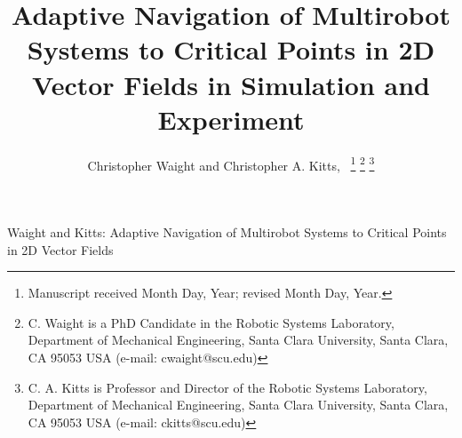 \documentclass[lettersize,journal]{IEEEtran}
\providecommand{\DIFdelbegin}{\protect\color{DIFdeltx}} %
\providecommand{\DIFdelend}{\protect\color{black}} %
\providecommand{\DIFscaledelfig}{0.5} %
\newlength{\DIFdelgraphicswidth} %
\newlength{\DIFdelgraphicsheight} %
\providecommand{\DIFdelincludegraphics}[2][]{%
\sbox{\DIFdelgraphicsbox}{\DIFOincludegraphics[#1]{#2}}%
\settoboxwidth{\DIFdelgraphicswidth}{\DIFdelgraphicsbox} %
\settoboxtotalheight{\DIFdelgraphicsheight}{\DIFdelgraphicsbox} %
\scalebox{\DIFscaledelfig}{%
\parbox[b]{\DIFdelgraphicswidth}{\usebox{\DIFdelgraphicsbox}\\[-\baselineskip] \rule{\DIFdelgraphicswidth}{0em}}\llap{\resizebox{\DIFdelgraphicswidth}{\DIFdelgraphicsheight}{%
\setlength{\unitlength}{\DIFdelgraphicswidth}%
\begin{picture}(1,1)%
\thicklines\linethickness{2pt} %
{\color{DIFdeltx}\put(0,0){\framebox(1,1){}}}%
{\color{DIFdeltx}\put(0,0){\line( 1,1){1}}}%
{\color{DIFdeltx}\put(0,1){\line(1,-1){1}}}%
\end{picture}%
}\hspace*{3pt}}} %
} %
\DeclareRobustCommand{\DIFdelbegin}{\DIFOdelbegin \let\includegraphics\DIFdelincludegraphics} %
\DeclareRobustCommand{\DIFdelend}{\DIFOdelend \let\includegraphics\DIFOincludegraphics} %
\begin{document}
\title{Adaptive Navigation of Multirobot Systems to Critical Points in 2D Vector Fields in Simulation and Experiment}
\author{Christopher Waight and Christopher A. Kitts,~
\thanks{Manuscript received Month Day, Year; revised Month Day, Year.}
\thanks{C. Waight is a PhD Candidate in the Robotic Systems Laboratory, Department of Mechanical Engineering, Santa Clara University, Santa Clara, CA 95053 USA (e-mail: cwaight@scu.edu)}
\thanks{C. A. Kitts is Professor and Director of the Robotic Systems Laboratory, Department of Mechanical Engineering, Santa Clara University, Santa Clara, CA 95053 USA (e-mail: ckitts@scu.edu)}
}
%
{Waight and Kitts: Adaptive Navigation of Multirobot Systems to Critical Points in 2D Vector Fields}


\DIFdelbegin %

\DIFdelend \maketitle
\end{document}
